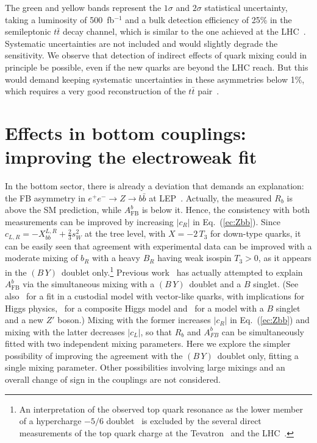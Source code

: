 \documentclass[12pt,a4paper]{article}
\newcommand{\by}{$(B\,Y)$}
\begin{document}
%
The green and yellow bands represent the $1\sigma$ and $2\sigma$ statistical uncertainty, taking a luminosity of 500~fb$^{-1}$ and a bulk detection efficiency of 25\% in the semileptonic $t \bar t$ decay channel, which is similar to the one achieved at the LHC~\cite{Aad:2012qf,Chatrchyan:2012ria}. Systematic uncertainties are not included and would slightly degrade the sensitivity. We observe that detection of indirect effects of quark mixing could in principle be possible, even if the new quarks are beyond the LHC reach. But this would demand keeping systematic uncertainties in these asymmetries below 1\%, which requires a very good reconstruction of the $t \bar t$ pair~\cite{Doublet:2012wf}. 


\section{Effects in bottom couplings: improving the electroweak fit}
\label{sec:fit}

In the bottom sector, there is already a deviation that demands an explanation: the FB asymmetry in $e^+ e^- \to Z \to b \bar b$ at LEP~\cite{ALEPH:2005ab}. Actually, the measured $R_b$ is above the SM prediction, while $A_\text{FB}^b$ is below it. Hence, the consistency with both measurements can be improved by increasing $|c_R|$ in Eq.~(\ref{ec:Zbb}). Since
$c_{L,R} = - X_{bb}^{L,R} + \frac{2}{3}s_W^2$ at the tree level, with $X = -2\,T_3$ for down-type quarks,
it can be easily seen that agreement with experimental data can be improved with a moderate mixing of $b_R$ with a heavy $B_R$ having weak isospin $T_3 > 0$, as it appears in the \by\ doublet only.\footnote{An interpretation of the observed top quark resonance as the lower member of a hypercharge $-5/6$ doublet~\cite{Chang:1999zc} is excluded by the several direct measurements of the top quark charge at the Tevatron~\cite{Abazov:2006vd,Aaltonen:2013sg} and the LHC~\cite{CMS:2012oua,Aad:2013uza}.}
Previous work~\cite{Choudhury:2001hs} has actually attempted to explain $A_\text{FB}^b$ via the simultaneous mixing with a \by\ doublet and a $B$ singlet. (See also~\cite{Batell:2012ca} for a fit in a custodial model with vector-like quarks, with implications for Higgs physics,~\cite{DaRold:2010as,Alvarez:2010js} for a composite Higgs model and~\cite{Bouchart:2008vp} for a model with a $B$ singlet and a new $Z'$ boson.) Mixing with the former increases $|c_R|$ in Eq.~(\ref{ec:Zbb}) and mixing with the latter decreases $|c_L|$, so that $R_b$ and $A_{FB}^b$ can be simultaneously fitted with two independent mixing parameters. Here we explore the simpler possibility of improving the agreement with the \by\ doublet only, fitting a single mixing parameter. Other possibilities involving large mixings and an overall change of sign in the couplings are not considered.
\end{document}
